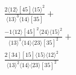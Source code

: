 \documentclass[varwidth, border=5pt]{standalone}
\begin{document}
\begin{my}
$\begin{gathered}
\scriptscriptstyle\frac{2⟨12⟩[45]⟨15⟩^2}{⟨13⟩^3⟨14⟩[35]}+\\
\scriptscriptstyle\frac{-1⟨12⟩[45]^2⟨24⟩⟨15⟩^2}{⟨13⟩^3⟨14⟩⟨23⟩[35]^2}+\\
\scriptscriptstyle\frac{2[34][15]⟨15⟩⟨12⟩^2}{⟨13⟩^2⟨14⟩⟨23⟩[35]^2}\phantom{+}
\end{gathered}$
\end{my}
\end{document}
